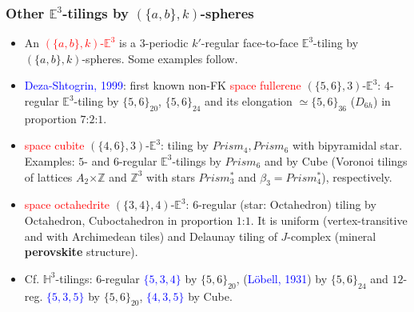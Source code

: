 \documentclass{beamer}
\begin{document}
\begin{frame}\frametitle{Other  $\mathbb{E}^3$-tilings by $(\{a,b\},k)$-spheres}
\vspace{-2mm}

\begin{itemize}

\item
An \textcolor{red}{$(\{a,b\},k)$-$\mathbb{E}^3$} is a $3$-periodic $k'$-regular face-to-face 
$\mathbb{E}^3$-tiling
by $(\{a,b\},k)$-spheres. Some examples follow.
\item
\textcolor{blue}{Deza-Shtogrin, 1999}: first  known non-FK \textcolor{red}{space 
fullerene} 
$(\{5,6\},3)$-$\mathbb{E}^3$: $4$-regular
 $\mathbb{E}^3$-tiling by $\{5,6\}_{20}$, $\{5,6\}_{24}$ and its elongation $\simeq \{5,6\}_{36}$ 
($D_{6h}$) in proportion $7$:$2$:$1$.\pause

\item 
\textcolor{red}{space cubite} $(\{4,6\},3)$-$\mathbb{E}^3$: tiling  by 
$Prism_4, Prism_6$ with bipyramidal
star. Examples: 
$5$- and $6$-regular 
 $\mathbb{E}^3$-tilings by 
$Prism_6$ and by Cube (Voronoi 
tilings 
of lattices $A_2 $$\times $$ \mathbb{Z}$ and  $ \mathbb{Z}^3$ 
with  
stars 
$Prism_3^{*}$ and $\beta_3=Prism_4^{*}$), respectively.
\pause

\item
\textcolor{red}{space octahedrite} $(\{3,4\},4)$-$\mathbb{E}^3$: 
$6$-regular 
 (star: Octahedron) tiling by Octahedron, Cuboctahedron
in proportion
$1$:$1$. It is 
uniform (vertex-transitive and with Archimedean tiles)
and Delaunay tiling of
$J$-complex (mineral {\bf perovskite} structure). 
\item
Cf. $\mathbb{H}^3$-tilings: $6$-regular \textcolor{blue}{$\{5,3,4\}$} by
 $\{5,6\}_{20}$, 
(\textcolor{blue}{L\"obell, 1931}) by 
$\{5,6\}_{24}$ and $12$-reg.  
\textcolor{blue}{$\{5,3,5\}$} by 
 $\{5,6\}_{20}$, 
\textcolor{blue}{$\{4,3,5\}$}  by
 Cube.



\end{itemize}
\end{frame}
\end{document}

